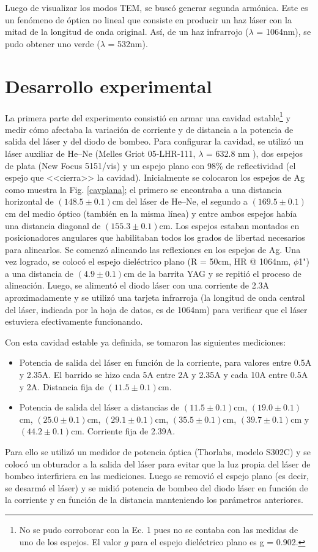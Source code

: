 \documentclass[10pt, a4paper]{article}%
\begin{document}
\begin{multicols}{2}
Luego de visualizar los modos TEM, se buscó generar segunda armónica. Este es un fenómeno de óptica no lineal que consiste en producir un haz láser con la mitad de la longitud de onda original. Así, de un haz infrarrojo ($\lambda$ = 1064nm), se pudo obtener uno verde ($\lambda$ = 532nm)\cite{2}.


\section*{Desarrollo experimental}
La primera parte del experimento consistió en armar una cavidad estable\footnote{No se pudo corroborar con la Ec. 1 pues no se contaba con las medidas de uno de los espejos. El valor $g$ para el espejo dieléctrico plano es g = 0.902.} y medir cómo afectaba la variación de corriente y de distancia a la potencia de salida del láser y del diodo de bombeo. Para configurar la cavidad, se utilizó un láser auxiliar de He--Ne (Melles Griot 05-LHR-111, $\lambda$ = 632.8 nm ), dos espejos de plata (New Focus 5151/vis) y un espejo plano con 98\% de reflectividad (el espejo que <<cierra>> la cavidad). Inicialmente se colocaron los espejos de Ag como muestra la Fig. \ref{cavplana}; el primero se encontraba a una distancia horizontal de $(148.5 \pm 0.1)$cm del láser de He--Ne, el segundo a $(169.5 \pm 0.1)$cm del medio óptico (también en la misma línea) y entre ambos espejos había una distancia diagonal de $(155.3 \pm 0.1)$cm. Los espejos estaban montados en posicionadores angulares que habilitaban todos los grados de libertad necesarios para alinearlos. Se comenzó alineando las reflexiones en los espejos de Ag. Una vez logrado, se colocó el espejo dieléctrico plano (R = 50cm, HR @ 1064nm, $\phi$1") a una distancia de $(4.9 \pm 0.1)$cm de la barrita YAG y se repitió el proceso de alineación. Luego, se alimentó el diodo láser con una corriente de 2.3A aproximadamente y se utilizó una tarjeta infrarroja (la longitud de onda central del láser, indicada por la hoja de datos, es de 1064nm) para verificar que el láser estuviera efectivamente funcionando. 

Con esta cavidad estable ya definida, se tomaron las siguientes mediciones:
\begin{itemize}
    \item Potencia de salida del láser en función de la corriente, para valores entre 0.5A y 2.35A. El barrido se hizo cada 5A entre 2A y 2.35A y cada 10A entre 0.5A y 2A. Distancia fija de $(11.5 \pm 0.1)$cm. 
    \item Potencia de salida del láser a distancias de $(11.5 \pm 0.1)$cm, $(19.0 \pm 0.1)$cm, $(25.0 \pm 0.1)$cm, $(29.1 \pm 0.1)$cm, $(35.5 \pm 0.1)$cm, $(39.7 \pm 0.1)$cm y $(44.2 \pm 0.1)$cm. Corriente fija de 2.39A. 
\end{itemize}
Para ello se utilizó un medidor de potencia óptica (Thorlabs, modelo S302C) y se colocó un obturador a la salida del láser para evitar que la luz propia del láser de bombeo interfiriera en las mediciones. Luego se removió el espejo plano (es decir, se desarmó el láser) y se midió potencia de bombeo del diodo láser en función de la corriente y en función de la distancia manteniendo los parámetros anteriores. 


\end{multicols}
\end{document}
